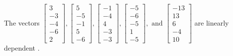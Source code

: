 \begin{exercise}
\begin{exerciseStatement}
  \end{exerciseStatement}
  \begin{exerciseAnswer}
   The vectors \(\left[\begin{array}{r}
3 \\
-3 \\
-4 \\
-6 \\
2
\end{array}\right] , \left[\begin{array}{r}
5 \\
-5 \\
-1 \\
5 \\
-6
\end{array}\right] , \left[\begin{array}{r}
-1 \\
-4 \\
4 \\
-3 \\
-3
\end{array}\right] , \left[\begin{array}{r}
-5 \\
-6 \\
-5 \\
1 \\
-5
\end{array}\right] , \text{ and } \left[\begin{array}{r}
-13 \\
13 \\
6 \\
-4 \\
10
\end{array}\right]\) are 
  	 linearly dependent  .
  


  \end{exerciseAnswer}
\end{exercise}